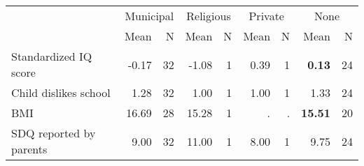 \begin{tabular}{l r r r r r r r r}
\toprule
& \multicolumn{2}{c}{Municipal} & \multicolumn{2}{c}{Religious} & \multicolumn{2}{c}{Private} & \multicolumn{2}{c}{None} \\
& \scriptsize Mean & \scriptsize N & \scriptsize Mean & \scriptsize N & \scriptsize Mean & \scriptsize N & \scriptsize Mean & \scriptsize N \\
\midrule
Standardized IQ score &     -0.17 &        32 &     -1.08 &         1 &      0.39 &         1 & \textbf{     0.13} &        24 \\
Child dislikes school &      1.28 &        32 &      1.00 &         1 &      1.00 &         1 &      1.33 &        24 \\
BMI &     16.69 &        28 &     15.28 &         1 &         . & . & \textbf{    15.51} &        20 \\
SDQ reported by parents &      9.00 &        32 &     11.00 &         1 &      8.00 &         1 &      9.75 &        24 \\
\bottomrule
\end{tabular}
